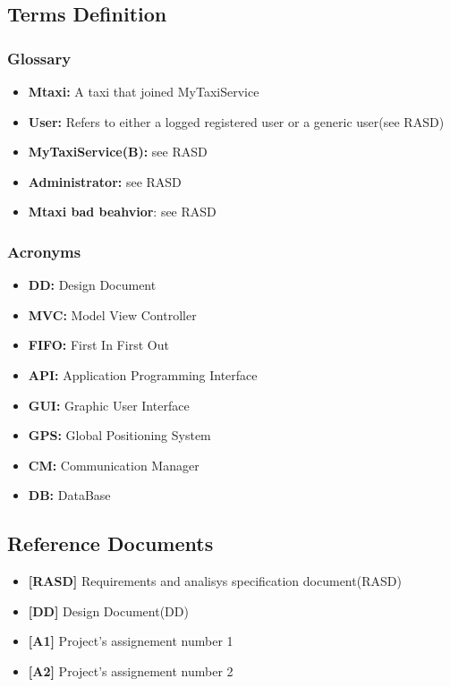 \documentclass[11pt,titlepage]{article} %
\begin{document}
\subsection{Terms Definition}
  \subsubsection{Glossary}
    \begin{itemize}
      \item \textbf{Mtaxi:} A taxi that joined MyTaxiService
      \item \textbf{User:} Refers to either a logged registered user or a generic user(see RASD)
      \item \textbf{MyTaxiService(B):} see RASD
      \item \textbf{Administrator:} see RASD
      \item \textbf{Mtaxi bad beahvior}: see RASD
    \end{itemize}
   
  \subsubsection{Acronyms}
    \begin{itemize}
      \item \textbf{DD:} Design Document
      \item \textbf{MVC:} Model View Controller
      \item \textbf{FIFO:} First In First Out
      \item \textbf{API:} Application Programming Interface
      \item \textbf{GUI:} Graphic User Interface
      \item \textbf{GPS:} Global Positioning System
      \item \textbf{CM:} Communication Manager
      \item \textbf{DB:} DataBase
     \end{itemize}

\subsection{Reference Documents}
  \begin{itemize}
   \item \textbf{[RASD]} Requirements and analisys specification document(RASD)
   \item \textbf{[DD]} Design Document(DD)
   \item \textbf{[A1]} Project's assignement number 1
   \item \textbf{[A2]} Project's assignement number 2
  \end{itemize}
\end{document}
